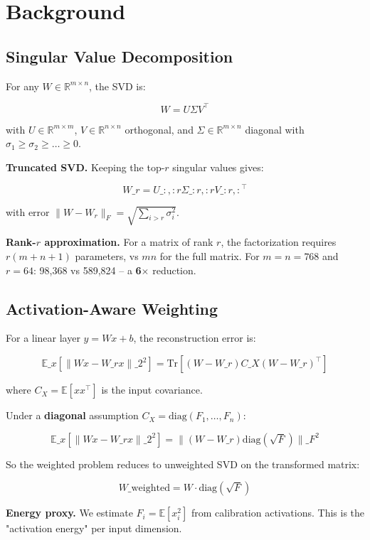 
\section{Background}

\subsection{Singular Value Decomposition}

For any $W \in \mathbb{R}^{m \times n}$, the SVD is:

\[
W = U \Sigma V^\top
\]

with $U \in \mathbb{R}^{m \times m}$, $V \in \mathbb{R}^{n \times n}$ 
orthogonal, and $\Sigma \in \mathbb{R}^{m \times n}$ diagonal with 
$\sigma_1 \geq \sigma_2 \geq \dots \geq 0$.

\textbf{Truncated SVD.} Keeping the top-$r$ singular values gives:

\[
W\_r = U\_{:, :r} \Sigma\_{:r, :r} V\_{:r, :}^\top
\]

with error $\|W - W_r\|_F = \sqrt{\sum_{i > r} \sigma_i^2}$.

\textbf{Rank-$r$ approximation.} For a matrix of rank $r$, the factorization 
requires $r(m + n + 1)$ parameters, vs $mn$ for the full matrix. For 
$m = n = 768$ and $r = 64$: 98,368 vs 589,824 -- a \textbf{6$\times$} reduction.

\subsection{Activation-Aware Weighting}

For a linear layer $y = Wx + b$, the reconstruction error is:

\[
\mathbb{E}\_x[\|Wx - W\_r x\|\_2^2] = \text{Tr}[(W - W\_r) C\_X (W - W\_r)^\top]
\]

where $C_X = \mathbb{E}[x x^\top]$ is the input covariance.

Under a \textbf{diagonal} assumption $C_X = \text{diag}(F_1, \dots, F_n)$:

\[
\mathbb{E}\_x[\|Wx - W\_r x\|\_2^2] = \|(W - W\_r) \text{diag}(\sqrt{F})\|\_F^2
\]

So the weighted problem reduces to unweighted SVD on the transformed matrix:

\[
W\_\text{weighted} = W \cdot \text{diag}(\sqrt{F})
\]

\textbf{Energy proxy.} We estimate $F_i = \mathbb{E}[x_i^2]$ from calibration 
activations. This is the "activation energy" per input dimension.

